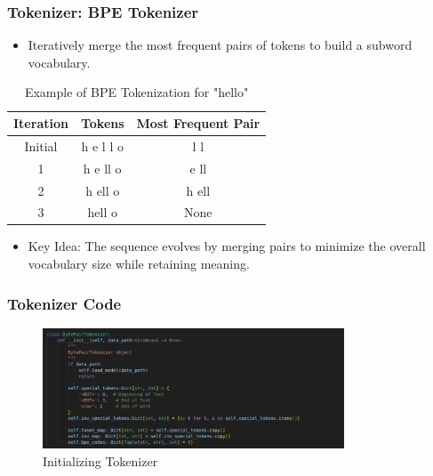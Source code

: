\documentclass[
    10pt %
    16:9, %
]{beamer}
\begin{document}
\frame
{
  \frametitle{Tokenizer: BPE Tokenizer}
  
  \begin{itemize}
      \item Iteratively merge the most frequent pairs of tokens to build a subword vocabulary.
  \end{itemize}

  \begin{table}[]
      \centering
      \begin{tabular}{|c|c|c|}
          \hline
          Iteration & Tokens & Most Frequent Pair \\ \hline
          Initial   & h e l l o & l l \\ \hline
          1         & h e ll o  & e ll \\ \hline
          2         & h ell o   & h ell \\ \hline
          3         & hell o    & None \\ \hline
      \end{tabular}
      \caption{Example of BPE Tokenization for "hello"}
  \end{table}
  
  \begin{itemize}
      \item Key Idea: The sequence evolves by merging pairs to minimize the overall vocabulary size while retaining meaning.
  \end{itemize}
}



 \frame
{
  \frametitle{Tokenizer Code}
  \begin{figure}
    \centering
    \includegraphics[width=0.8\textwidth]{tokenizer_init.png}
    \caption{Initializing Tokenizer}
  \end{figure}

}
\end{document}
